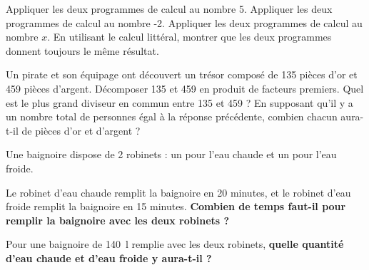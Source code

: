 \documentclass[../Cours.tex]{subfiles}
\begin{document}
\begin{questions}
\question Appliquer les deux programmes de calcul au nombre 5.
\question Appliquer les deux programmes de calcul au nombre -2.
\question Appliquer les deux programmes de calcul au nombre $x$.
\question En utilisant le calcul littéral, montrer que les deux programmes donnent toujours le même résultat.


Un pirate et son équipage ont découvert un trésor composé de 135 pièces d'or et 459 pièces d'argent. 
\question Décomposer 135 et 459 en produit de facteurs premiers.
\question Quel est le plus grand diviseur en commun entre 135 et 459 ?
\question En supposant qu'il y a un nombre total de personnes égal à la réponse précédente, combien chacun aura-t-il de pièces d'or et d'argent ?

    Une baignoire dispose de 2 robinets : un pour l'eau chaude et un pour l'eau froide. 
    
    \question Le robinet d'eau chaude remplit la baignoire en 20 minutes, et le robinet d'eau froide remplit la baignoire en 15 minutes. \textbf{Combien de temps faut-il pour remplir la baignoire avec les deux robinets ?}

    \question Pour une baignoire de \qty{140}{\litre} remplie avec les deux robinets, \textbf{quelle quantité d'eau chaude et d'eau froide y aura-t-il ?}

\end{questions}
\end{document}
